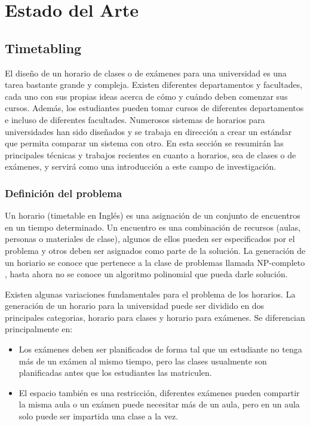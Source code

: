 \chapter{Estado del Arte}

\section{Timetabling}

El diseño de un horario de clases o de exámenes para una universidad es una tarea bastante grande y compleja.
Existen diferentes departamentos y facultades, cada uno con sus propias ideas acerca de cómo y cuándo deben
comenzar sus cursos. Además, los estudiantes pueden tomar cursos de diferentes departamentos e incluso de
diferentes facultades. Numerosos sistemas de horarios para universidades han sido diseñados y se trabaja
en dirección a crear un estándar que permita comparar un sistema con otro. En esta sección se resumirán
las principales técnicas y trabajos recientes en cuanto a horarios, sea de clases o de exámenes, y servirá
como una introducción a este campo de investigación.

\subsection{Definición del problema}

Un horario (timetable en Inglés) es una asignación de un conjunto de encuentros en un tiempo determinado.
Un encuentro es una combinación de recursos (aulas, personas o materiales de clase), algunos de ellos pueden
ser especificados por el problema y otros deben ser asignados como parte de la solución. La generación de un
horiario se conoce que pertenece a la clase de problemas llamada NP-completo \cite{TB Cooper and JH Kingston},
hasta ahora no se conoce un algoritmo polinomial que pueda darle solución.

Existen algunas variaciones fundamentales para el problema de los horarios. La generación de un horario para
la universidad puede ser dividido en dos principales categorias, horario para clases y horario para exámenes.
Se diferencian principalmente en:

\begin{itemize}
	\item Los exámenes deben ser planificados de forma tal que un estudiante no tenga más de un exámen al
		mismo tiempo, pero las clases usualmente son planificadas antes que los estudiantes las matriculen.
	\item El espacio también es una restricción, diferentes exámenes pueden compartir la misma aula o un exámen
		puede necesitar más de un aula, pero en un aula solo puede ser impartida una clase a la vez.
\end{itemize}

